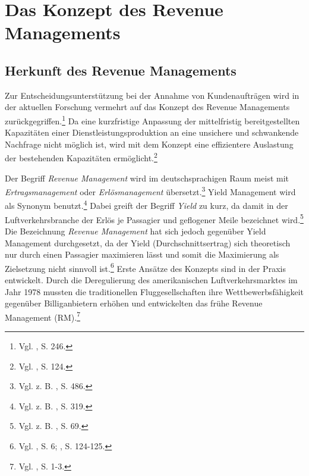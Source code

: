 \chapter{Das Konzept des Revenue Managements}\label{KapitelDP}
\setcounter{footnote}{36}  %


\section{Herkunft des Revenue Managements}
Zur Entscheidungsunterstützung bei der Annahme von Kundenaufträgen wird in der aktuellen Forschung vermehrt auf das Konzept des Revenue Managements zurückgegriffen.\footnote{Vgl. \cite{klein2001revenue}, S. 246.} Da eine kurzfristige Anpassung der mittelfristig bereitgestellten Kapazitäten einer Dienstleistungsproduktion an eine unsichere und schwankende Nachfrage nicht möglich ist, wird mit dem Konzept eine effizientere Auslastung der bestehenden Kapazitäten ermöglicht.\footnote{Vgl. \cite{ing2005revenue}, S. 124.}

Der Begriff \textit{Revenue Management} wird im deutschsprachigen Raum meist mit \textit{Ertrags}\-\textit{management} oder \textit{Erlösmanagement} übersetzt.\footnote{Vgl. z. B. \cite{zehle1991yield}, S. 486.} Yield Management wird als Synonym benutzt.\footnote{Vgl. z. B. \cite{kolisch2006revenue}, S. 319.} Dabei greift der Begriff \textit{Yield} zu kurz, da damit in der Luftverkehrsbranche der Erlös je Passagier und geflogener Meile bezeichnet wird.\footnote{Vgl. z. B. \cite{weatherford1998tutorial}, S. 69.} Die Bezeichnung \textit{Revenue Management} hat sich jedoch gegenüber Yield Management durchgesetzt, da der Yield (Durchschnittsertrag) sich theoretisch nur durch einen Passagier maximieren lässt und somit die Maximierung als Zielsetzung nicht sinnvoll ist.\footnote{Vgl. \cite{Klein:2008aa}, S. 6; \cite{ing2005revenue}, S. 124-125.} Erste Ansätze des Konzepts sind in der Praxis entwickelt. Durch die Deregulierung des amerikanischen Luftverkehrsmarktes im Jahr 1978 mussten die traditionellen Fluggesellschaften ihre Wettbewerbsfähigkeit gegenüber Billiganbietern erhöhen und entwickelten das frühe Revenue Management (RM).\footnote{Vgl. \cite{Petrick:2009aa}, S. 1-3.}

